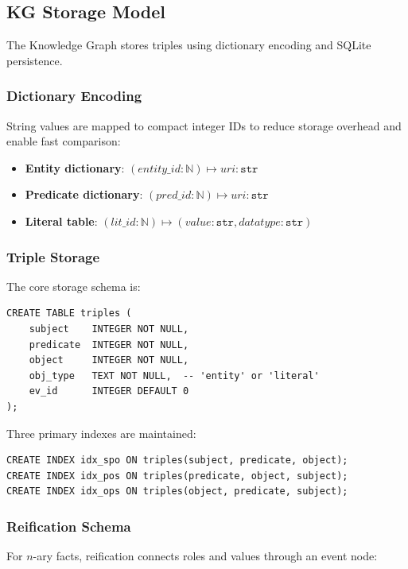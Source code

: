 \subsection{KG Storage Model}

The Knowledge Graph stores triples using dictionary encoding and SQLite persistence.

\subsubsection{Dictionary Encoding}

String values are mapped to compact integer IDs to reduce storage overhead and enable fast comparison:

\begin{itemize}
    \item \textbf{Entity dictionary}: $(entity\_id : \mathbb{N}) \mapsto uri : \texttt{str}$
    \item \textbf{Predicate dictionary}: $(pred\_id : \mathbb{N}) \mapsto uri : \texttt{str}$
    \item \textbf{Literal table}: $(lit\_id : \mathbb{N}) \mapsto (value : \texttt{str}, datatype : \texttt{str})$
\end{itemize}

\subsubsection{Triple Storage}

The core storage schema is:

\begin{verbatim}
CREATE TABLE triples (
    subject    INTEGER NOT NULL,
    predicate  INTEGER NOT NULL,
    object     INTEGER NOT NULL,
    obj_type   TEXT NOT NULL,  -- 'entity' or 'literal'
    ev_id      INTEGER DEFAULT 0
);
\end{verbatim}

Three primary indexes are maintained:
\begin{verbatim}
CREATE INDEX idx_spo ON triples(subject, predicate, object);
CREATE INDEX idx_pos ON triples(predicate, object, subject);
CREATE INDEX idx_ops ON triples(object, predicate, subject);
\end{verbatim}

\subsubsection{Reification Schema}

For $n$-ary facts, reification connects roles and values through an event node:

